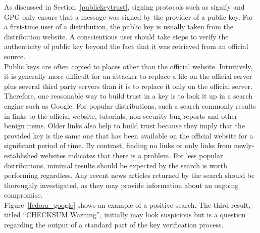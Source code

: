 \documentclass[conference]{IEEEtran}
\begin{document}
As discussed in Section~\ref{publickeytrust}, signing protocols such as signify and GPG only
ensure that a message was signed by the provider of a public key. For a first-time user
of a distribution, the public key is usually taken from the distribution website.
A conscientious user should take steps to verify the authenticity of public key beyond the
fact that it was retrieved from an official source.\\
\indent Public keys are often copied to places
other than the official website. Intuitively, it is generally more difficult for an attacker
to replace a file on the official server plus several third party servers than it is to
replace it only on the official server. Therefore, one reasonable way to build trust in a
key is to look it up in a search engine such as Google. For popular distributions, such
a search commonly results in links to the official website, tutorials, non-security bug
reports and other benign items. Older links also help to build trust because they imply
that the provided key is the same one that has been available on the official website for
a significant period of time. By contrast, finding no links or only links from newly-
established websites indicates that there is a problem. For less popular distributions,
minimal results should be expected by the search is worth performing regardless. Any recent
news articles returned
by the search should be thoroughly investigated, as they may provide information about an
ongoing compromise.\\
\indent Figure~\ref{fedora_google} shows an example of a positive search. The
third result, titled ``CHECKSUM Warning'', initially may look suspicious but is a question
regarding the output of a standard part of the key verification process.
\end{document}
